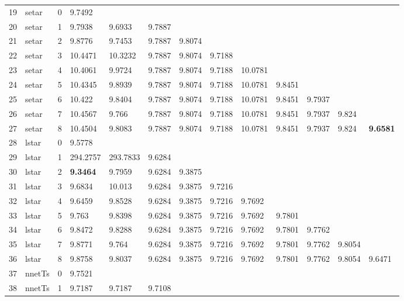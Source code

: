 \documentclass[10pt,a4paper]{article}
\begin{document}
\begin{table}[ht]
\begin{tabular}{rlrllllllllll}
   \hline
19 & setar &     0 & 9.7492 &  &  &  &  &  &  &  &  &  \\ 
  20 & setar &     1 & 9.7938 & 9.6933 & 9.7887 &  &  &  &  &  &  &  \\ 
  21 & setar &     2 & 9.8776 & 9.7453 & 9.7887 & 9.8074 &  &  &  &  &  &  \\ 
  22 & setar &     3 & 10.4471 & 10.3232 & 9.7887 & 9.8074 & 9.7188 &  &  &  &  &  \\ 
  23 & setar &     4 & 10.4061 & 9.9724 & 9.7887 & 9.8074 & 9.7188 & 10.0781 &  &  &  &  \\ 
  24 & setar &     5 & 10.4345 & 9.8939 & 9.7887 & 9.8074 & 9.7188 & 10.0781 & 9.8451 &  &  &  \\ 
  25 & setar &     6 & 10.422 & 9.8404 & 9.7887 & 9.8074 & 9.7188 & 10.0781 & 9.8451 & 9.7937 &  &  \\ 
  26 & setar &     7 & 10.4567 & 9.766 & 9.7887 & 9.8074 & 9.7188 & 10.0781 & 9.8451 & 9.7937 & 9.824 &  \\ 
  27 & setar &     8 & 10.4504 & 9.8083 & 9.7887 & 9.8074 & 9.7188 & 10.0781 & 9.8451 & 9.7937 & 9.824 & \textbf{9.6581} \\ 
   \hline
28 & lstar &     0 & 9.5778 &  &  &  &  &  &  &  &  &  \\ 
  29 & lstar &     1 & 294.2757 & 293.7833 & 9.6284 &  &  &  &  &  &  &  \\ 
  30 & lstar &     2 & \textbf{9.3464} & 9.7959 & 9.6284 & 9.3875 &  &  &  &  &  &  \\ 
  31 & lstar &     3 & 9.6834 & 10.013 & 9.6284 & 9.3875 & 9.7216 &  &  &  &  &  \\ 
  32 & lstar &     4 & 9.6459 & 9.8528 & 9.6284 & 9.3875 & 9.7216 & 9.7692 &  &  &  &  \\ 
  33 & lstar &     5 & 9.763 & 9.8398 & 9.6284 & 9.3875 & 9.7216 & 9.7692 & 9.7801 &  &  &  \\ 
  34 & lstar &     6 & 9.8472 & 9.8288 & 9.6284 & 9.3875 & 9.7216 & 9.7692 & 9.7801 & 9.7762 &  &  \\ 
  35 & lstar &     7 & 9.8771 & 9.764 & 9.6284 & 9.3875 & 9.7216 & 9.7692 & 9.7801 & 9.7762 & 9.8054 &  \\ 
  36 & lstar &     8 & 9.8758 & 9.8037 & 9.6284 & 9.3875 & 9.7216 & 9.7692 & 9.7801 & 9.7762 & 9.8054 & 9.6471 \\ 
   \hline
37 & nnetTs &     0 & 9.7521 &  &  &  &  &  &  &  &  &  \\ 
  38 & nnetTs &     1 & 9.7187 & 9.7187 & 9.7108 &  &  &  &  &  &  &  \\ 

\end{tabular}
\end{table}
\end{document}

